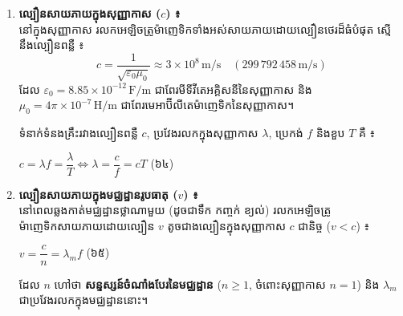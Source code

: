 \noindent
\begin{enumerate}[label=\textbf{\arabic*.} ,itemsep=4pt, topsep=2pt, leftmargin=1.6em]
	\item \textbf{ល្បឿនសាយភាយក្នុងសុញ្ញាកាស ($c$) ៖}\\
	នៅក្នុងសុញ្ញាកាស រលកអេឡិចត្រូម៉ាញេទិកទាំងអស់សាយភាយដោយល្បឿនថេរដ៏ធំបំផុត ស្មើនឹងល្បឿនពន្លឺ ៖
	\[ c = \dfrac{1}{\sqrt{\varepsilon_0 \mu_0}} \approx 3 \times 10^8\,\text{m/s} \quad (299\,792\,458\,\text{m/s}) \]
	ដែល $\varepsilon_0 = 8.85 \times 10^{-12}\,\text{F/m}$ ជាពែរមីទីវីតេអគ្គិសនីនៃសុញ្ញាកាស និង $\mu_0 = 4\pi \times 10^{-7}\,\text{H/m}$ ជាពែរមេអាប៊ីលីតេម៉ាញេទិកនៃសុញ្ញាកាស។

	\vspace{0.2em}
	ទំនាក់ទំនងគ្រឹះរវាងល្បឿនពន្លឺ $c$, ប្រវែងរលកក្នុងសុញ្ញាកាស $\lambda$, ប្រេកង់ $f$ និងខួប $T$ គឺ ៖
	\begin{center}
		$\boxed{c = \lambda f = \dfrac{\lambda}{T}} \iff \boxed{\lambda = \dfrac{c}{f} = c T}$ \quad (៦៤)
	\end{center}

	\item \textbf{ល្បឿនសាយភាយក្នុងមជ្ឈដ្ឋានរូបធាតុ ($v$) ៖}\\
	នៅពេលឆ្លងកាត់មជ្ឈដ្ឋានថ្លាណាមួយ (ដូចជាទឹក កញ្ចក់ ខ្យល់) រលកអេឡិចត្រូម៉ាញេទិកសាយភាយដោយល្បឿន $v$ តូចជាងល្បឿនក្នុងសុញ្ញាកាស $c$ ជានិច្ច ($v < c$) ៖
	\begin{center}
		$\boxed{v = \dfrac{c}{n} = \lambda_m f}$ \quad (៦៥)
	\end{center}
	ដែល $n$ ហៅថា \textbf{សន្ទស្សន៍ចំណាំងបែរនៃមជ្ឈដ្ឋាន} ($n \ge 1$, ចំពោះសុញ្ញាកាស $n = 1$) និង $\lambda_m$ ជាប្រវែងរលកក្នុងមជ្ឈដ្ឋាននោះ។
\end{enumerate}

\vspace{0.3em}

